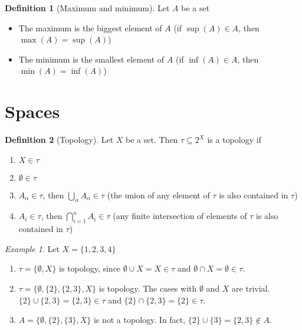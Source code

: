 \documentclass{article}
\newenvironment{enumrom}{\begin{enumerate}[label=(\roman*)]}{\end{enumerate}}
\theoremstyle{definition}
\newtheorem{definition}{Definition}[section]
\theoremstyle{definition}
\theoremstyle{plain}
\theoremstyle{plain}
\theoremstyle{plain}
\theoremstyle{plain}
\theoremstyle{definition}
\theoremstyle{remark}
\newtheorem{exampled}{Example}[definition]
\theoremstyle{remark}
\theoremstyle{remark}
\theoremstyle{remark}
\begin{document}
\begin{definition}[Maximum and minimum]
  Let $A$ be a set
  \begin{itemize}
  \item The maximum is the biggest element of $A$ (if $\sup(A) \in A$, then $\max(A) = \sup(A)$)
  \item The minimum is the smallest element of $A$ (if $\inf(A) \in A$, then $\min(A) = \inf(A)$)
  \end{itemize}
\end{definition}


\newpage
\section{Spaces}


\begin{definition}[Topology]
  Let $X$ be a set. Then $\tau \subseteq 2^X$ is a topology if
  \begin{enumrom}
  \item $X \in \tau$
  \item $\emptyset \in \tau$
  \item $A_\alpha \in \tau$, then $\displaystyle \bigcup_\alpha A_\alpha \in \tau$ (the union of any element of $\tau$ is also contained in $\tau$)
  \item $A_i \in \tau$, then $\displaystyle \bigcap_{i = 1}^n A_i \in \tau$ (any finite intersection of elements of $\tau$ is also contained in $\tau$)
  \end{enumrom}
\end{definition}

\begin{exampled}
  Let $X = \{ 1, 2, 3, 4 \}$
  \begin{enumerate}
  \item $\tau = \{ \emptyset, X \}$ is topology, since $\emptyset \cup X = X \in \tau$ and $\emptyset \cap X = \emptyset \in \tau$.
  \item $\tau = \{ \emptyset, \{ 2 \}, \{ 2, 3 \}, X \}$ is topology. The cases with $\emptyset$ and $X$ are trivial. $\{ 2 \} \cup \{ 2, 3 \} = \{ 2, 3 \} \in \tau$ and $\{ 2 \} \cap \{ 2, 3 \} = \{ 2 \} \in \tau$.
  \item $A = \{ \emptyset, \{ 2 \}, \{ 3 \}, X \}$ is not a topology. In fact, $\{ 2 \} \cup \{ 3 \} = \{ 2, 3 \} \notin A$.
  \end{enumerate}
\end{exampled}
\end{document}
